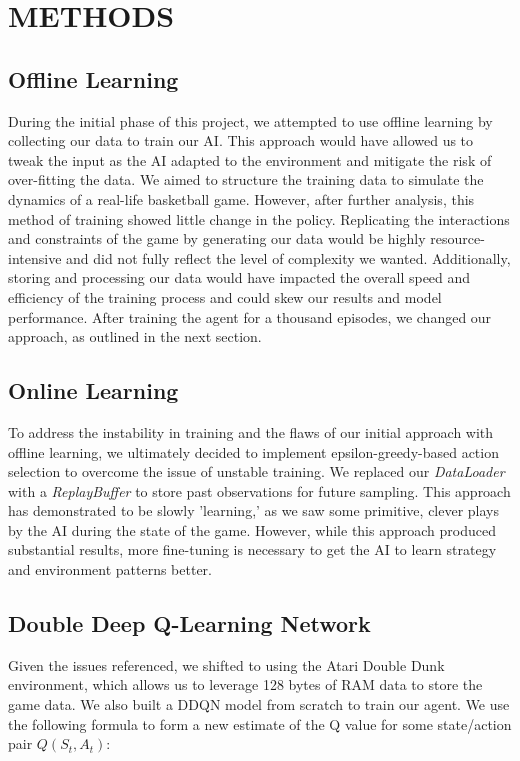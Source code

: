 \documentclass[letterpaper, 10 pt, conference]{ieeeconf}
\begin{document}
\vspace{.5cm}
\section{\textbf{METHODS}}
\vspace{.5cm}
 \subsection{Offline Learning} 

 During the initial phase of this project, we attempted to use offline learning by collecting our data to train our AI. This approach would have allowed us to tweak the input as the AI adapted to the environment and mitigate the risk of over-fitting the data. We aimed to structure the training data to simulate the dynamics of a real-life basketball game. However, after further analysis, this method of training showed little change in the policy. Replicating the interactions and constraints of the game by generating our data would be highly resource-intensive and did not fully reflect the level of complexity we wanted. Additionally, storing and processing our data would have impacted the overall speed and efficiency of the training process and could skew our results and model performance. After training the agent for a thousand episodes, we changed our approach, as outlined in the next section. \\

 \subsection{Online Learning} 

 To address the instability in training and the flaws of our initial approach with offline learning, we ultimately decided to implement epsilon-greedy-based action selection to overcome the issue of unstable training. We replaced our \textit{DataLoader} with a \textit{ReplayBuffer} to store past observations for future sampling. This approach has demonstrated to be slowly 'learning,' as we saw some primitive, clever plays by the AI during the state of the game. However, while this approach produced substantial results, more fine-tuning is necessary to get the AI to learn strategy and environment patterns better. \\
 
\subsection{Double Deep Q-Learning Network}
 Given the issues referenced, we shifted to using the Atari Double Dunk environment, which allows us to leverage 128 bytes of RAM data to store the game data. We also built a DDQN model from scratch to train our agent. We use the following formula to form a new estimate of the Q value for some state/action pair $Q(S_t, A_t)$: \\
\end{document}
